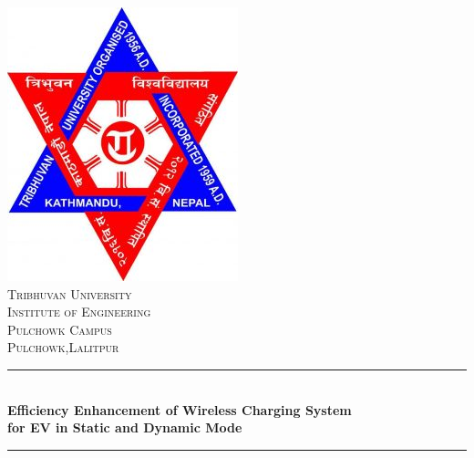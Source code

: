 \begin{titlepage}
	\newcommand{\HRule}{\rule{\linewidth}{1mm}} %
	\center %
	\includegraphics[scale=0.5]{logo.jpg}\\[1cm] %
	\textsc{\large Tribhuvan University}\\[0.4cm] %
	\textsc{\Large Institute of Engineering} \\[0.4cm] %
	\textsc{\LARGE Pulchowk Campus}\\[0.4cm] %
	\textsc{\large Pulchowk,Lalitpur}\\[0.4cm] %
	\HRule \\[0.4cm]
	{ \large \bfseries Efficiency Enhancement of Wireless Charging System \\[0.3cm] for EV in Static and Dynamic Mode} \\[0.4cm] %
	\HRule \\[1.5cm]



\end{titlepage}
